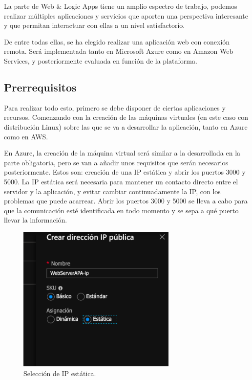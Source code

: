 \documentclass[english,runningheads,a4paper]{llncs}[2018/03/10]
\begin{document}
La parte de Web \& Logic Apps tiene un amplio espectro de trabajo, podemos realizar
múltiples aplicaciones y servicios que aporten una perspectiva interesante y que
permitan interactuar con ellas a un nivel satisfactorio.

De entre todas ellas, se ha elegido realizar una aplicación web con conexión remota.
Será implementada tanto en Microsoft Azure como en Amazon Web Services, y
posteriormente evaluada en función de la plataforma.

\subsection{Prerrequisitos}

Para realizar todo esto, primero se debe disponer de ciertas aplicaciones y
recursos. Comenzando con la creación de las máquinas virtuales (en este caso con
distribución Linux) sobre las que se va a desarrollar la aplicación, tanto en Azure
como en AWS.

En Azure, la creación de la máquina virtual será similar a la desarrollada en la
parte obligatoria, pero se van a añadir unos requisitos que serán necesarios
posteriormente. Estos son: creación de una IP estática y abrir los puertos 3000 y
5000. La IP estática será necesaria para mantener un contacto directo entre el
servidor y la aplicación, y evitar cambiar continuadamente la IP, con los problemas
que puede acarrear. Abrir los puertos 3000 y 5000 se lleva a cabo para que la
comunicación esté identificada en todo momento y se sepa a qué puerto llevar la
información.

\begin{figure}[h!]
 \centering
 \includegraphics[width=0.7\textwidth]{./Web/Azure/Azure1.png}
 \caption{Selección de IP estática.}
\end{figure}
\end{document}
